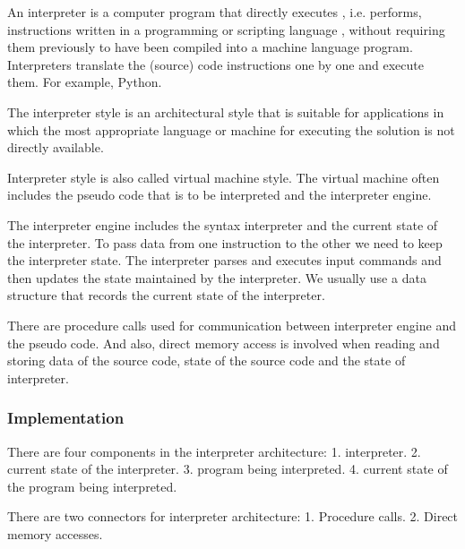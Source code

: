 
\begin{summary}
    An interpreter is a computer program that directly executes , i.e.
    performs, instructions written in a programming or scripting language ,
    without requiring them previously to have been compiled into a machine
    language program.  Interpreters translate the (source) code instructions
    one by one and execute them. For example, Python.

    The interpreter style is an architectural style that is suitable for
    applications in which the most appropriate language or machine for
    executing the solution is not directly available.

    Interpreter style is also called virtual machine style. The virtual machine
    often includes the pseudo code that is to be interpreted and the
    interpreter engine.

    The interpreter engine includes the syntax interpreter and the current
    state of the interpreter. To pass data from one instruction to the other we
    need to keep the interpreter state. The interpreter parses and executes
    input commands and then updates the state maintained by the interpreter. We
    usually use a data structure that records the current state of the
    interpreter.

    There are procedure calls used for communication between interpreter engine
    and the pseudo code. And also, direct memory access is involved when
    reading and storing data of the source code, state of the source code and
    the state of interpreter.
\end{summary}

\subsubsection{Implementation}
There are four components in the interpreter architecture:
1. interpreter. 
2. current state of the interpreter. 
3. program being interpreted. 
4. current state of the program being interpreted.

There are two connectors for interpreter architecture:
1. Procedure calls. 
2. Direct memory accesses.

